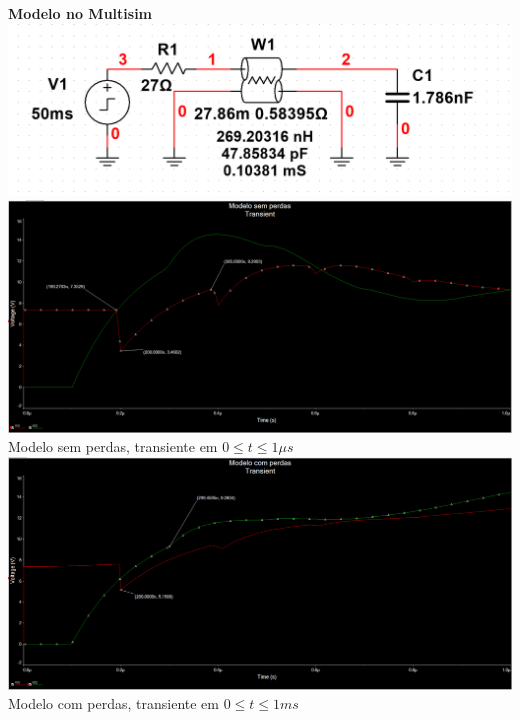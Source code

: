 \documentclass[12pt,a4paper]{article}
\begin{document}
\begin{center}
    \small{\textbf{Modelo no Multisim}}\\

    \includegraphics[scale=0.45]{multisim.png}\\
    
    \includegraphics[scale=0.3]{multisim c.png}\\
    
    \small{Modelo sem perdas, transiente em $0 \le t \le 1\mu s$}\\

    
    
    \includegraphics[scale=0.3]{multisim e.png}\\
    
    \small{Modelo com perdas, transiente em $0 \le t \le 1ms$}\\
\end{center}
\end{document}
